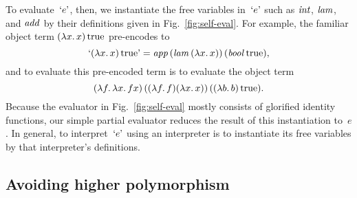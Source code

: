 To evaluate~$\encode{e}$, then, we
instantiate the free variables in~$\encode{e}$ such as $\ident{int}$,
$\ident{lam}$, and $\ident{add}$ by their definitions given in
Fig.~\ref{fig:self-eval}.  For
example, the familiar object term $(\fun{x}x)\True$ pre-encodes to
\begin{equation*}
    \encode{(\fun{x}x)\True} = \ident{app}
    (\ident{lam} (\fun{x} x))\, (\ident{bool} \True),
\end{equation*}
and to evaluate this pre-encoded term is to evaluate the object term
\begin{equation*}
    (\fun{f} \fun{x} fx) \,
    ((\fun{f} f) (\fun{x} x))\, ((\fun{b} b) \True).
\end{equation*}
Because the evaluator in Fig.~\ref{fig:self-eval} mostly consists 
of glorified identity
functions, our simple partial evaluator reduces the
result of this instantiation to~$e$.  In general, to
interpret~$\encode{e}$ using an interpreter is to instantiate its free
variables by that interpreter's definitions.

\subsection{Avoiding higher polymorphism}

